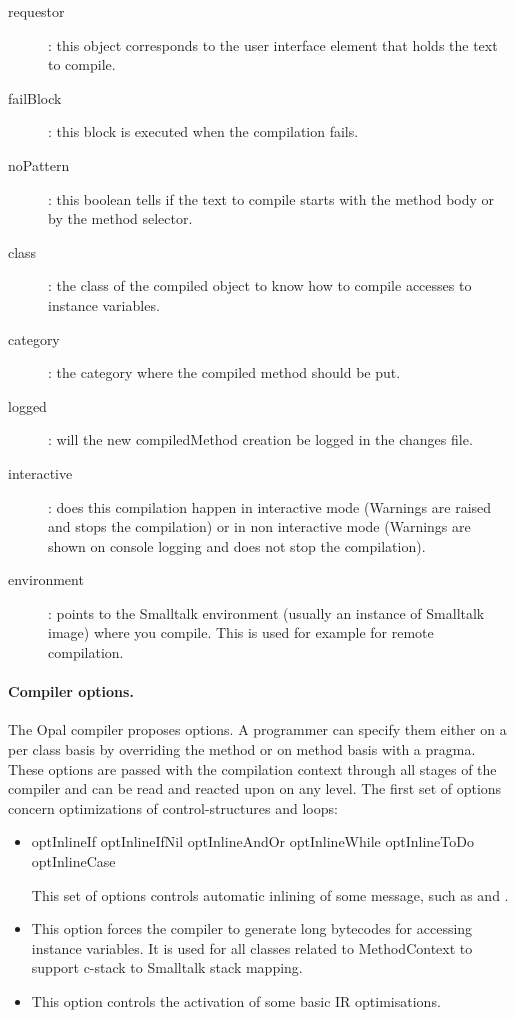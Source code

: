 \documentclass[preprint,10pt]{sigplanconf}
\begin{document}
\begin{description}
\item[requestor]: this object corresponds to the user interface element that holds the text to compile.
\item[failBlock]: this block is executed when the compilation fails.
\item[noPattern]: this boolean tells if the text to compile starts with the method body or by the method selector.
\item[class]: the class of the compiled object to know how to compile accesses to instance variables.
\item[category]: the category where the compiled method should be put.
\item[logged]: will the new compiledMethod creation be logged in the changes file.
\item[interactive]: does this compilation happen in interactive mode (Warnings are raised and stops the compilation) or in non interactive mode (Warnings are shown on console logging and does not stop the compilation).
\item[environment]: points to the Smalltalk environment (usually an instance of Smalltalk image) where you compile. This is used for example for remote compilation.
\end{description}

\paragraph{Compiler options.}

The Opal compiler proposes options.
A programmer can specify them either on a per class basis by overriding the  method or on method basis with a pragma. 
These options are passed with the compilation context through all stages of the compiler and can be read and reacted upon on any level.
The first set of options concern optimizations of control-structures and loops:


\begin{itemize}

\item  \begin{code}{}
optInlineIf
optInlineIfNil
optInlineAndOr
optInlineWhile
optInlineToDo
optInlineCase
\end{code}

This set of options controls automatic inlining of some message, such as  and .

\item {}

This option forces the compiler to generate long bytecodes for accessing instance variables.
It is used for all classes related to MethodContext to support c-stack to Smalltalk stack mapping.

\item {}

This option controls the activation of some basic IR optimisations.

\end{itemize}
\end{document}
